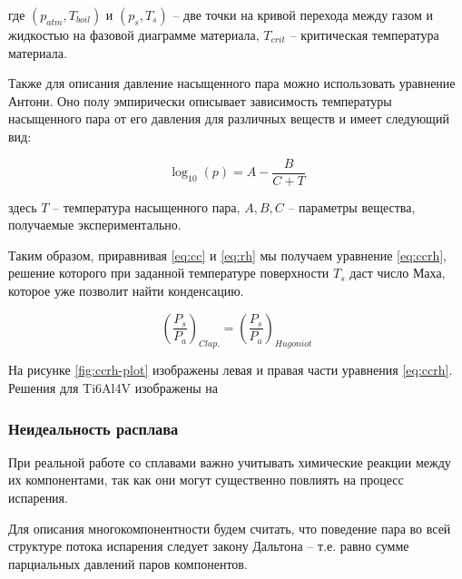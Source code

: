 \noindent
где $(p_{atm}, T_{boil})$ и $(p_{s}, T_{s})$ -- две точки на кривой перехода между газом и жидкостью на фазовой диаграмме материала, $T_{crit}$ -- критическая температура материала.

Также для описания давление насыщенного пара можно использовать уравнение Антони. Оно полу эмпирически описывает зависимость температуры насыщенного пара от его давления для различных веществ и имеет следующий вид:

\begin{equation}
    \log_{10}(p) = A - \frac{B}{C + T}
\end{equation}

\noindent
здесь $T$ -- температура насыщенного пара, $A, B, C$ -- параметры вещества, получаемые экспериментально.

Таким образом, приравнивая \ref{eq:cc} и \ref{eq:rh} мы получаем уравнение \ref{eq:ccrh}, решение которого при заданной температуре поверхности $T_s$ даст число Маха, которое уже позволит найти конденсацию.

\begin{equation*}
    \label{eq:ccrh}
    \left( \frac{P_s}{P_a} \right)_{Clap.} = \left( \frac{P_s}{P_a} \right)_{Hugoniot}
\end{equation*}


На рисунке \ref{fig:ccrh-plot} изображены левая и правая части уравнения \ref{eq:ccrh}. Решения для Ti6Al4V изображены на 



\subsubsection{Неидеальность расплава}

При реальной работе со сплавами важно учитывать химические реакции между их компонентами, так как они могут существенно повлиять на процесс испарения.

Для описания многокомпонентности будем считать, что поведение пара во всей структуре потока испарения следует закону Дальтона -- т.е. равно сумме парциальных давлений паров компонентов.

